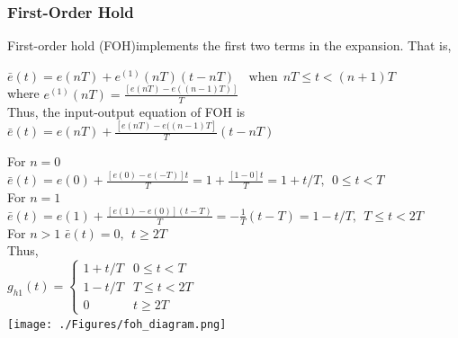 \documentclass[mathserif, 10pt]{beamer} %
\begin{document}
\frame
{

\renewcommand{\theenumi}{\alph{enumi}}
\frametitle{First-Order Hold}

First-order hold (FOH)implements the first two terms in the expansion. That is,
\\ \vspace{0.1in}

	$\bar e(t) = e(nT) + e^{(1)}(nT)(t-nT) ~~~~~ \text{when}~~ nT \leq t< (n+1)T$\\ \vspace{0.05in}
where	$e^{(1)}(nT) = \frac{[e(nT) -e((n-1)T)]}{T}$ \\ \vspace{0.05in}
Thus, the input-output equation of FOH is \\ \vspace{0.05in}
	$\bar e(t) = e(nT) + \frac{[e(nT) -e((n-1)T]}{T}(t-nT)$\\ \vspace{0.05in}

	For $ n=0$\\
$ \bar e(t) = e(0) + \frac{[e(0)-e(-T)]t}{T} = 1+\frac{[1-0]t}{T} = 1+t/T,~~0 \le t <T$\\ \vspace{0.05in}
	For $n=1 $\\
$\bar e(t) = e(1) + \frac{[e(1) - e(0)](t-T)}{T} =-\frac{1}{T}(t-T) = 1-t/T,~~T\le t<2T$\\ \vspace{0.05in}
	For $n>1$ $ \bar e(t) = 0,~~ t\ge 2T$\\ \vspace{.05in}
Thus,\\
$g_{h1}(t) = \left \{
\begin{array}{cc}
	1+t/T& 0 \le t<T\\	
	1-t/T &T \le t<2T\\
	0 & t \ge 2T
\end{array}  \right.$ \\



\vspace{-.7in}
\hspace{2.2in}
\texttt{[image: ./Figures/foh\_diagram.png]} \\

}
\end{document}
